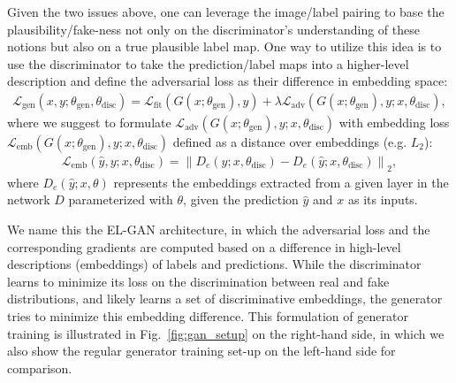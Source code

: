 \documentclass{article} \usepackage{nips13submit_e,times}
\newcommand{\elgan}{\mbox{EL-GAN}}
\newcommand\norm[1]{\left\lVert#1\right\rVert}
\begin{document}
Given the two issues above, one can leverage the image/label pairing to base the plausibility/fake-ness not only on the discriminator's understanding of these notions but also on a true plausible label map.
One way to utilize this idea is to use the discriminator to take the prediction/label maps into a higher-level description and define the adversarial loss as their difference in embedding space:
\begin{align}
\mathcal{L}_\text{gen}(x, y; \theta_\text{gen}, \theta_\text{disc}) = \mathcal{L}_\text{fit}(G(x; \theta_\text{gen}), y) + \lambda \mathcal{L}_\text{adv}(G(x; \theta_\text{gen}), y; x, \theta_\text{disc}),
\label{eq:lgen_twoinputs}
\end{align}
where we suggest to formulate $\mathcal{L}_\text{adv}(G(x; \theta_\text{gen}), y; x, \theta_\text{disc})$ with embedding loss $\mathcal{L}_\text{emb}(G(x; \theta_\text{gen}), y; x, \theta_\text{disc})$ defined as a distance over embeddings (e.g. $L_2$):
\begin{align}
\mathcal{L}_\text{emb}(\hat{y}, y; x, \theta_\text{disc})=\norm{D_{e}(y;x,\theta_\text{disc})-D_{e}(\hat{y}; x, \theta_\text{disc})}_2,
\label{eq:lgen_embeddingloss}
\end{align}
where $D_{e}(\hat{y}; x, \theta)$ represents the embeddings extracted from a given layer in the network $D$ parameterized with $\theta$, given the prediction $\hat{y}$ and $x$ as its inputs.

We name this the \elgan{} architecture, in which the adversarial loss and the corresponding gradients are computed based on a difference in high-level descriptions (embeddings) of labels and predictions.
While the discriminator learns to minimize its loss on the discrimination between real and fake distributions, and likely learns a set of discriminative embeddings, the generator tries to minimize this embedding difference.
This formulation of generator training is illustrated in Fig.~\ref{fig:gan_setup} on the right-hand side, in which we also show the regular generator training set-up on the left-hand side for comparison.
\end{document}
